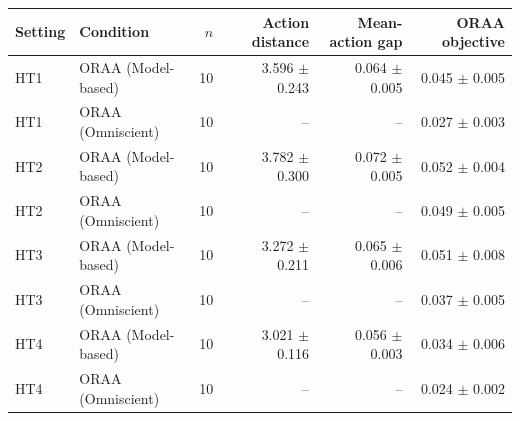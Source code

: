 \begin{tabular}{llrrrr}
\toprule
Setting & Condition & $n$ & Action distance & Mean-action gap & ORAA objective \\
\midrule
HT1 & ORAA (Model-based) & 10 & 3.596 $\pm$ 0.243 & 0.064 $\pm$ 0.005 & 0.045 $\pm$ 0.005 \\
HT1 & ORAA (Omniscient) & 10 & -- & -- & 0.027 $\pm$ 0.003 \\
HT2 & ORAA (Model-based) & 10 & 3.782 $\pm$ 0.300 & 0.072 $\pm$ 0.005 & 0.052 $\pm$ 0.004 \\
HT2 & ORAA (Omniscient) & 10 & -- & -- & 0.049 $\pm$ 0.005 \\
HT3 & ORAA (Model-based) & 10 & 3.272 $\pm$ 0.211 & 0.065 $\pm$ 0.006 & 0.051 $\pm$ 0.008 \\
HT3 & ORAA (Omniscient) & 10 & -- & -- & 0.037 $\pm$ 0.005 \\
HT4 & ORAA (Model-based) & 10 & 3.021 $\pm$ 0.116 & 0.056 $\pm$ 0.003 & 0.034 $\pm$ 0.006 \\
HT4 & ORAA (Omniscient) & 10 & -- & -- & 0.024 $\pm$ 0.002 \\
\bottomrule
\end{tabular}
